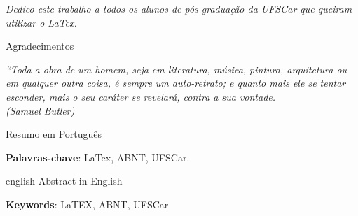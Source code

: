 \documentclass[
	12pt,				%
	openright,			%
	twoside,			%
	a4paper,			%
	english,			%
	spanish,			%
	brazil				%
	]{ufscar}
\begin{document}
\begin{dedicatoria}
   \vspace*{\fill}
   \centering
   \noindent
   \textit{ Dedico este trabalho a todos os alunos de pós-graduação da UFSCar que queiram utilizar o LaTex.} \vspace*{\fill}
\end{dedicatoria}

\begin{agradecimentos}
Agradecimentos

\end{agradecimentos}



\begin{epigrafe}
    \vspace*{\fill}
	\begin{flushright}
		\textit{``Toda a obra de um homem, seja em literatura, música, pintura, arquitetura ou em qualquer outra coisa, é sempre um auto-retrato; e quanto mais ele se tentar esconder, mais o seu caráter se revelará, contra a sua vontade.\\
		(Samuel Butler)}
	\end{flushright}
\end{epigrafe}


\setlength{\absparsep}{18pt} %
\begin{resumo}
Resumo em Português

 \textbf{Palavras-chave}: LaTex, ABNT, UFSCar.
\end{resumo}

\begin{resumo}[Abstract]
 \begin{otherlanguage*}{english}
Abstract in English

   \textbf{Keywords}: LaTEX, ABNT, UFSCar
 \end{otherlanguage*}
\end{resumo}


\listoffigures*
\cleardoublepage
\end{document}
